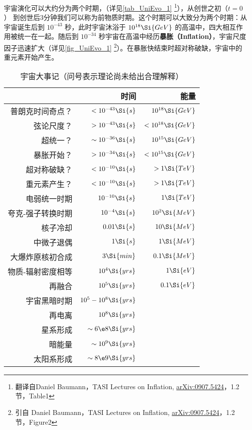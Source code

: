
\begin{issues}
\issueNeedCite
\issueMissDepend
\end{issues}
宇宙演化可以大约分为两个时期，（详见\autoref{tab_UniEvo_1} \footnote{翻译自Daniel Baumann，TASI Lectures on Inflation, \href{https://arxiv.org/abs/0907.5424}{arXiv:0907.5424}，1.2 节，Table1}），从创世之初（$t=0$） 到创世后3分钟我们可以称为前物质时期。这个时期可以大致分为两个时期：从宇宙诞生后到 $10^{-43}$ 秒，此时宇宙沐浴于 $10^{18}\Si{GeV}$ 的高温中，四大相互作用被统一在一起。随后到 $10^{-34}$ 秒宇宙在高温中经历\textbf{暴胀（Inflation）}，宇宙尺度因子迅速扩大（详见\autoref{fig_UniEvo_1} \footnote{引自 Daniel Baumann，TASI Lectures on Inflation, \href{https://arxiv.org/abs/0907.5424}{arXiv:0907.5424}，1.2 节，Figure2}）。在暴胀快结束时超对称破缺，宇宙中的重元素开始产生。

\begin{table}[ht]
\centering
\caption{宇宙大事记（问号表示理论尚未给出合理解释）}\label{tab_UniEvo_1}
\begin{tabular}{|r|r|r|}
\hline
 & 时间 & 能量 \\
\hline
普朗克时间奇点？ & $<10^{-43}\Si{s}$ & $10^{18}\Si{GeV}$ \\
\hline
弦论尺度？       & $>10^{-43}\Si{s}$ & $<10^{18}\Si{GeV}$ \\
\hline
超统一？         & $\sim 10^{-36}\Si{s}$ & $10^{15}\Si{GeV}$ \\
\hline
暴胀开始？       & $>10^{-34}\Si{s}$ & $<10^{15} \Si{GeV}$ \\
\hline
超对称破缺？     & $<10^{-10}\Si{s}$ & $>1 \Si{TeV}$ \\
\hline
重元素产生？     & $<10^{-10}\Si{s}$ & $>1 \Si{TeV}$ \\
\hline
电弱统一时期    & $10^{-10}\Si{s}$ & $1 \Si{TeV}$ \\
\hline
夸克-强子转换时期 & $10^{-4}\Si{s}$ & $10^2 \Si{MeV}$ \\
\hline
核子冷却        & $0.01\Si{s}$ & $10 \Si{MeV}$ \\
\hline
中微子退偶      & $1 \Si{s}$  & $1 \Si{MeV}$ \\
\hline
大爆炸原核初合成  & $3 \Si{min}$ & $0.1 \Si{MeV}$ \\
\hline
物质-辐射密度相等 & $10^4\Si{yrs}$  & $1 \Si{eV}$ \\
\hline
再融合 & $10^5\Si{yrs}$  & $0.1 \Si{eV}$ \\
\hline
宇宙黑暗时期 & $10^5 - 10^8\Si{yrs}$  &  \\
\hline
再电离 & $10^8\Si{yrs}$  &  \\
\hline
星系形成 & $\sim 6\e8\Si{yrs}$  &  \\
\hline
暗能量 & $\sim 10^9\Si{yrs}$  &  \\
\hline
太阳系形成 & $ \sim 8\e9\Si{yrs}$  &  \\
\hline
\end{tabular}
\end{table}

